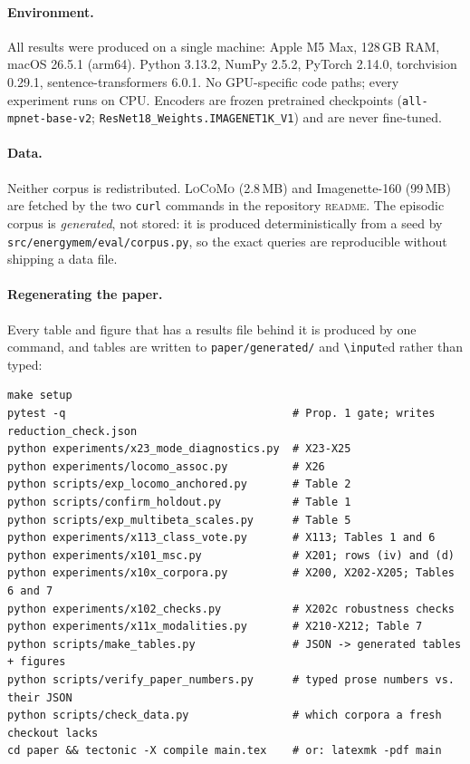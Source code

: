 \paragraph{Environment.} All results were produced on a single machine: Apple M5 Max,
128\,GB RAM, macOS 26.5.1 (arm64). Python 3.13.2, NumPy 2.5.2, PyTorch 2.14.0, torchvision
0.29.1, sentence-transformers 6.0.1. No GPU-specific code paths; every experiment runs on
CPU. Encoders are frozen pretrained checkpoints
(\texttt{all-mpnet-base-v2}; \texttt{ResNet18\_Weights.IMAGENET1K\_V1}) and are never
fine-tuned.

\paragraph{Data.} Neither corpus is redistributed. \textsc{LoCoMo} (2.8\,MB) and
Imagenette-160 (99\,MB) are fetched by the two \texttt{curl} commands in the repository
\textsc{readme}. The episodic corpus is \emph{generated}, not stored: it is produced
deterministically from a seed by \texttt{src/energymem/eval/corpus.py}, so the exact queries
are reproducible without shipping a data file.

\paragraph{Regenerating the paper.} Every table and figure that has a results file behind it
is produced by one command, and tables are written to \texttt{paper/generated/} and
\texttt{\textbackslash input}ed rather than typed:

{\footnotesize\begin{verbatim}
make setup
pytest -q                                   # Prop. 1 gate; writes reduction_check.json
python experiments/x23_mode_diagnostics.py  # X23-X25
python experiments/locomo_assoc.py          # X26
python scripts/exp_locomo_anchored.py       # Table 2
python scripts/confirm_holdout.py           # Table 1
python scripts/exp_multibeta_scales.py      # Table 5
python experiments/x113_class_vote.py       # X113; Tables 1 and 6
python experiments/x101_msc.py              # X201; rows (iv) and (d)
python experiments/x10x_corpora.py          # X200, X202-X205; Tables 6 and 7
python experiments/x102_checks.py           # X202c robustness checks
python experiments/x11x_modalities.py       # X210-X212; Table 7
python scripts/make_tables.py               # JSON -> generated tables + figures
python scripts/verify_paper_numbers.py      # typed prose numbers vs. their JSON
python scripts/check_data.py                # which corpora a fresh checkout lacks
cd paper && tectonic -X compile main.tex    # or: latexmk -pdf main
\end{verbatim}}

